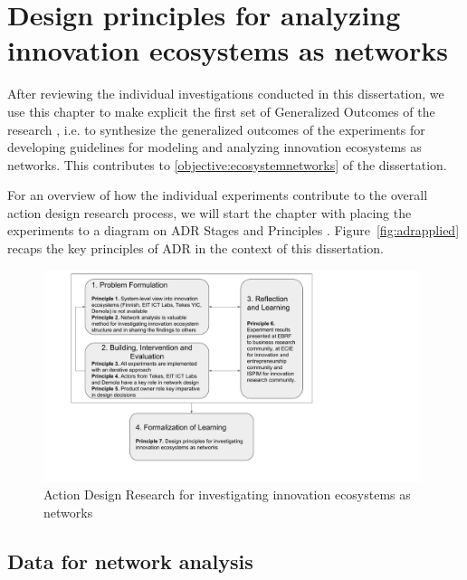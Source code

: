 \chapter{Design principles for analyzing innovation ecosystems as networks}
\label{ch:ecosystemnetworks}

After reviewing the individual investigations conducted in this dissertation, we use this chapter to make explicit the first set of Generalized Outcomes of the research \citep{Sein2011ActionResearch}, i.e. to synthesize the generalized outcomes of the experiments for developing guidelines for modeling and analyzing innovation ecosystems as networks. This contributes to \ref{objective:ecosystemnetworks} of the dissertation.

For an overview of how the individual experiments contribute to the overall action design research process, we will start the chapter with placing the experiments to a diagram on ADR Stages and Principles \citep{Sein2011ActionResearch}. Figure~\ref{fig:adrapplied} recaps the key principles of ADR in the context of this dissertation.

\begin{figure}[htb]
\centering
\includegraphics[width=11cm]{diagram/ADR-innovation-ecosystems-as-networks.pdf}
\caption{Action Design Research for investigating innovation ecosystems as networks \citep[following][]{Sein2011ActionResearch}\label{fig:adrapplied}}
\label{fig:ADR-innovation-ecosystems-as-networks}
\end{figure}

\section{Data for network analysis}
\label{sec:networkdata}

